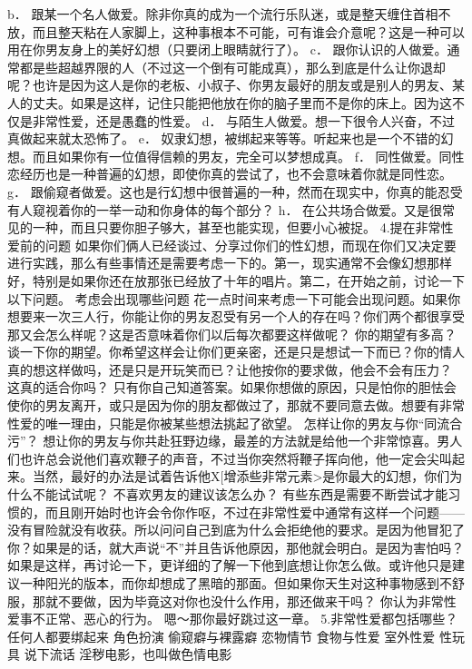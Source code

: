 \documentclass[12pt,UTF8]{ctexbook}
\begin{document}
b． 跟某一个名人做爱。除非你真的成为一个流行乐队迷，或是整天缠住首相不放，而且整天粘在人家脚上，这种事根本不可能，可有谁会介意呢？这是一种可以用在你男友身上的美好幻想（只要闭上眼睛就行了）。
c． 跟你认识的人做爱。通常都是些超越界限的人（不过这一个倒有可能成真），那么到底是什么让你退却呢？也许是因为这人是你的老板、小叔子、你男友最好的朋友或是别人的男友、某人的丈夫。如果是这样，记住只能把他放在你的脑子里而不是你的床上。因为这不仅是非常性爱，还是愚蠢的性爱。
d． 与陌生人做爱。想一下很令人兴奋，不过真做起来就太恐怖了。
e． 奴隶幻想，被绑起来等等。听起来也是一个不错的幻想。而且如果你有一位值得信赖的男友，完全可以梦想成真。
f． 同性做爱。同性恋经历也是一种普遍的幻想，即使你真的尝试了，也不会意味着你就是同性恋。
g． 跟偷窥者做爱。这也是行幻想中很普遍的一种，然而在现实中，你真的能忍受有人窥视着你的一举一动和你身体的每个部分？
h． 在公共场合做爱。又是很常见的一种，而且只要你胆子够大，甚至也能实现，但要小心被捉。
4.提在非常性爱前的问题
如果你们俩人已经谈过、分享过你们的性幻想，而现在你们又决定要进行实践，那么有些事情还是需要考虑一下的。第一，现实通常不会像幻想那样好，特别是如果你还在放那张已经放了十年的唱片。第二，在开始之前，讨论一下以下问题。
考虑会出现哪些问题
花一点时间来考虑一下可能会出现问题。如果你想要来一次三人行，你能让你的男友忍受有另一个人的存在吗？你们两个都很享受那又会怎么样呢？这是否意味着你们以后每次都要这样做呢？
你的期望有多高？
谈一下你的期望。你希望这样会让你们更亲密，还是只是想试一下而已？你的情人真的想这样做吗，还是只是开玩笑而已？让他按你的要求做，他会不会有压力？
这真的适合你吗？
只有你自己知道答案。如果你想做的原因，只是怕你的胆怯会使你的男友离开，或只是因为你的朋友都做过了，那就不要同意去做。想要有非常性爱的唯一理由，只能是你被某些想法挑起了欲望。
怎样让你的男友与你“同流合污”？
想让你的男友与你共赴狂野边缘，最差的方法就是给他一个非常惊喜。男人们也许总会说他们喜欢鞭子的声音，不过当你突然将鞭子挥向他，他一定会尖叫起来。当然，最好的办法是试着告诉他X[增添些非常元素>是你最大的幻想，你们为什么不能试试呢？
不喜欢男友的建议该怎么办？
有些东西是需要不断尝试才能习惯的，而且刚开始时也许会令你作呕，不过在非常性爱中通常有这样一个问题——没有冒险就没有收获。所以问问自己到底为什么会拒绝他的要求。是因为他冒犯了你？如果是的话，就大声说“不”并且告诉他原因，那他就会明白。是因为害怕吗？如果是这样，再讨论一下，更详细的了解一下他到底想让你怎么做。或许他只是建议一种阳光的版本，而你却想成了黑暗的那面。但如果你天生对这种事物感到不舒服，那就不要做，因为毕竟这对你也没什么作用，那还做来干吗？
你认为非常性爱事不正常、恶心的行为。
嗯～那你最好跳过这一章。
5.非常性爱都包括哪些？
任何人都要绑起来
角色扮演
偷窥癖与裸露癖
恋物情节
食物与性爱
室外性爱
性玩具
说下流话
淫秽电影，也叫做色情电影
\end{document}

